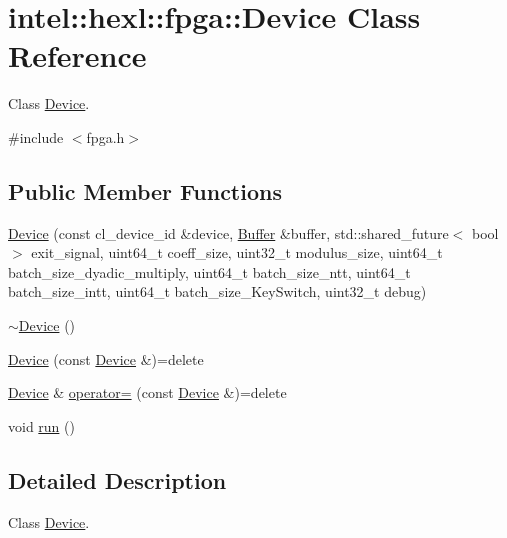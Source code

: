\hypertarget{classintel_1_1hexl_1_1fpga_1_1Device}{\section{intel\-:\-:hexl\-:\-:fpga\-:\-:Device Class Reference}
\label{classintel_1_1hexl_1_1fpga_1_1Device}
}


Class \hyperlink{classintel_1_1hexl_1_1fpga_1_1Device}{Device}.  




{\ttfamily \#include $<$fpga.\-h$>$}

\subsection*{Public Member Functions}
\begin{DoxyCompactItemize}
\item 
\hyperlink{classintel_1_1hexl_1_1fpga_1_1Device_a0cfde50893b2950ef08ec71631bb9613}{Device} (const cl\-\_\-device\-\_\-id \&device, \hyperlink{classintel_1_1hexl_1_1fpga_1_1Buffer}{Buffer} \&buffer, std\-::shared\-\_\-future$<$ bool $>$ exit\-\_\-signal, uint64\-\_\-t coeff\-\_\-size, uint32\-\_\-t modulus\-\_\-size, uint64\-\_\-t batch\-\_\-size\-\_\-dyadic\-\_\-multiply, uint64\-\_\-t batch\-\_\-size\-\_\-ntt, uint64\-\_\-t batch\-\_\-size\-\_\-intt, uint64\-\_\-t batch\-\_\-size\-\_\-\-Key\-Switch, uint32\-\_\-t debug)
\item 
\hyperlink{classintel_1_1hexl_1_1fpga_1_1Device_ad7adf350f85c3d0b66607424d3281d5f}{$\sim$\-Device} ()
\item 
\hyperlink{classintel_1_1hexl_1_1fpga_1_1Device_a17f72dc8cfd551066bfb89138c638cf2}{Device} (const \hyperlink{classintel_1_1hexl_1_1fpga_1_1Device}{Device} \&)=delete
\item 
\hyperlink{classintel_1_1hexl_1_1fpga_1_1Device}{Device} \& \hyperlink{classintel_1_1hexl_1_1fpga_1_1Device_a9701bf457e5d3dede4de9cc1442d24a9}{operator=} (const \hyperlink{classintel_1_1hexl_1_1fpga_1_1Device}{Device} \&)=delete
\item 
void \hyperlink{classintel_1_1hexl_1_1fpga_1_1Device_a91c2dde32f856517ba1f90e6191d2850}{run} ()
\end{DoxyCompactItemize}


\subsection{Detailed Description}
Class \hyperlink{classintel_1_1hexl_1_1fpga_1_1Device}{Device}. 

